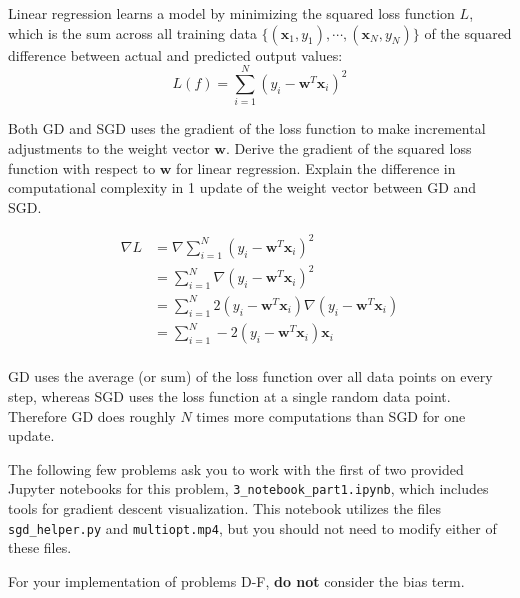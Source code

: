 Linear regression learns a model by minimizing the squared loss function $L$, which is the sum across all training data $\{(\mathbf{x}_1, y_1),\cdots,(\mathbf{x}_N, y_N)\}$ of the squared difference between actual and predicted output values:
\[L(f) = \sum_{i=1}^N (y_i - \mathbf{w}^T\mathbf{x}_i)^2\]

\begin{problem}[2]
  Both GD and SGD uses the gradient of the loss function to make incremental adjustments to the weight vector $\mathbf{w}$. Derive the gradient of the squared loss function with respect to $\mathbf{w}$ for linear regression. Explain the difference in computational complexity in 1 update of the weight vector between GD and SGD. 
\end{problem}
\begin{solution}
  \begin{align*}
    \nabla L &= \nabla \sum_{i=1}^N (y_i - \mathbf{w}^T \mathbf{x}_i)^2 \\
    &= \sum_{i=1}^N \nabla (y_i - \mathbf{w}^T \mathbf{x}_i)^2 \\
    &= \sum_{i=1}^N 2 (y_i - \mathbf{w}^T \mathbf{x}_i) \nabla (y_i - \mathbf{w}^T \mathbf{x}_i) \\
    &= \sum_{i=1}^N - 2 (y_i - \mathbf{w}^T \mathbf{x}_i) \mathbf{x}_i \\
  \end{align*}

  GD uses the average (or sum) of the loss function over all data points on every step, whereas SGD uses the loss function at a single random data point.
  Therefore GD does roughly $N$ times more computations than SGD for one update.
\end{solution}

The following few problems ask you to work with the first of two provided Jupyter notebooks for this problem, \texttt{3_notebook_part1.ipynb}, which includes tools for gradient descent visualization. This notebook utilizes the files \texttt{sgd_helper.py} and \texttt{multiopt.mp4}, but you should not need to modify either of these files. 

For your implementation of problems D-F, \textbf{do not} consider the bias term.

